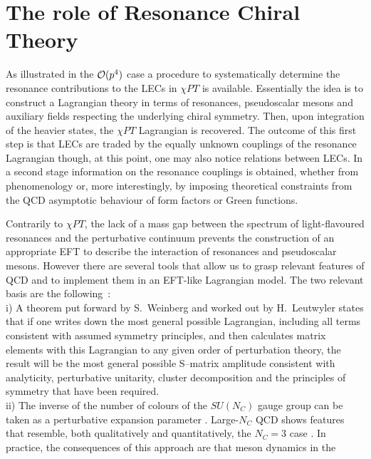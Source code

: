 \documentclass{appolb}
\begin{document}
\section{The role of Resonance Chiral Theory}
As illustrated in the ${\cal O}(p^4)$ case \cite{Ecker:1988te,Ecker:1989yg} a procedure to systematically determine
the resonance contributions to the LECs in $\chi PT$ is available. Essentially the idea is to construct a Lagrangian
theory in terms of resonances, pseudoscalar mesons and auxiliary fields respecting the underlying chiral symmetry. Then,
upon integration of the heavier states, the $\chi PT$ Lagrangian is recovered. The outcome of this first step is that
LECs are traded by the equally unknown couplings of the resonance Lagrangian though, at this point, one may also notice
relations between LECs. In a second stage information on the resonance couplings is obtained, whether from phenomenology
or, more interestingly, by imposing theoretical constraints from the QCD asymptotic behaviour of form factors or Green 
functions. 
\par
Contrarily to $\chi PT$, the lack of a mass gap between the spectrum of light-flavoured resonances and the perturbative
continuum prevents the construction of an appropriate EFT to describe the interaction of resonances
and pseudoscalar mesons. However there are several tools that allow us to grasp relevant features of QCD and to 
implement them in an EFT-like Lagrangian model. The two relevant basis are the following~:
\vspace*{0.2cm} \\
i) A theorem put forward by S.~Weinberg \cite{Weinberg:1978kz} and worked out by H.~Leutwyler \cite{Leutwyler:1993iq}
states that if one writes down the most general possible Lagrangian, including all terms consistent with  
assumed symmetry principles, and then calculates matrix elements with this Lagrangian to any given order of
perturbation theory, the result will be the most general possible S--matrix amplitude consistent with analyticity, 
perturbative unitarity, cluster decomposition and the principles of symmetry that have been required. 
\vspace*{0.1cm} \\
ii) The inverse of the number of colours of the $SU(N_C)$ gauge group can be taken as a perturbative expansion
parameter \cite{'tHooft:1974hx}. Large-$N_C$ QCD shows features that resemble, both qualitatively and quantitatively,
the $N_C=3$ case \cite{Peris:1998nj}. In practice, the consequences of this approach are that meson dynamics in the
\end{document}
